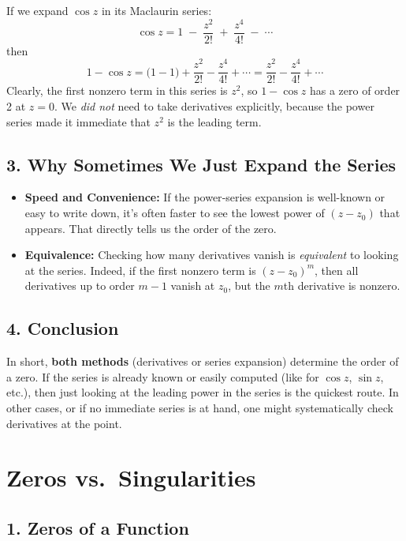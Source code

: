 \documentclass[12pt]{article}
\theoremstyle{definition} %
\theoremstyle{plain} %
\begin{document}
If we expand $\cos z$ in its Maclaurin series:
\[
\cos z 
= 1 \;-\; \frac{z^2}{2!} \;+\; \frac{z^4}{4!} \;-\;\cdots
\]
then
\[
1 - \cos z
= \bigl(1 - 1\bigr)
+ \frac{z^2}{2!}
- \frac{z^4}{4!}
+ \cdots
= \frac{z^2}{2!} - \frac{z^4}{4!} + \cdots
\]
Clearly, the first nonzero term in this series is $z^2$, so $1-\cos z$ has a zero of order 2 at $z=0$. We \emph{did not} need to take derivatives explicitly, because the power series made it immediate that $z^2$ is the leading term.

\subsection*{3. Why Sometimes We Just Expand the Series}

\begin{itemize}
\item \textbf{Speed and Convenience:} If the power‐series expansion is well-known or easy to write down, it's often faster to see the lowest power of $(z - z_0)$ that appears. That directly tells us the order of the zero.
\item \textbf{Equivalence:} Checking how many derivatives vanish is \emph{equivalent} to looking at the series. Indeed, if the first nonzero term is $(z-z_0)^m$, then all derivatives up to order $m-1$ vanish at $z_0$, but the $m$th derivative is nonzero.
\end{itemize}

\subsection*{4. Conclusion}

In short, \textbf{both methods} (derivatives or series expansion) determine the order of a zero. If the series is already known or easily computed (like for $\cos z$, $\sin z$, etc.), then just looking at the leading power in the series is the quickest route. In other cases, or if no immediate series is at hand, one might systematically check derivatives at the point.


\section*{Zeros vs.\ Singularities}

\subsection*{1. Zeros of a Function}
\end{document}
